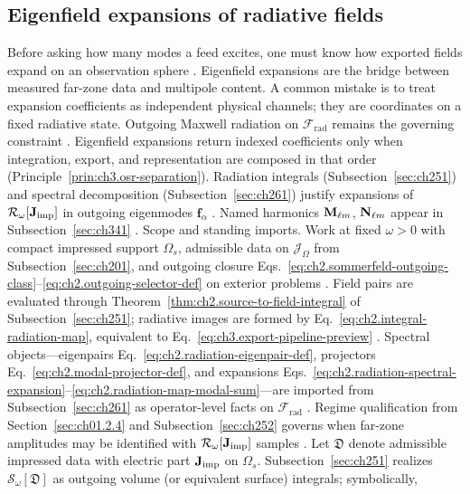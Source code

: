 \subsection{Eigenfield expansions of radiative fields}
\label{sec:ch302}
Before asking how many modes a feed excites, one must know how exported fields expand on an observation sphere \cite{stratton1941}. Eigenfield expansions are the bridge between measured far-zone data and multipole content. A common mistake is to treat expansion coefficients as independent physical channels; they are coordinates on a fixed radiative state. Outgoing Maxwell radiation on $\mathcal{F}_{\mathrm{rad}}$ remains the governing constraint \cite{stratton1941}.
Eigenfield expansions return indexed coefficients only when integration, export, and representation
are composed in that order (Principle~\ref{prin:ch3.osr-separation}). Radiation integrals
(Subsection~\ref{sec:ch251}) and spectral decomposition (Subsection~\ref{sec:ch261}) justify
expansions of \(\mathcal{R}_\omega[\mathbf{J}_{\mathrm{imp}}]\) in outgoing eigenmodes \(\mathbf{f}_\alpha\)
\cite{stratton1941}. Named harmonics \(\mathbf{M}_{\ell m}\), \(\mathbf{N}_{\ell m}\) appear in
Subsection~\ref{sec:ch341} \cite{hansen1988}.
Scope and standing imports. Work at fixed \(\omega>0\) with compact impressed support \(\Omega_s\), admissible data on
\(\mathcal{J}_\Omega\) from Subsection~\ref{sec:ch201}, and outgoing closure
Eqs.~\eqref{eq:ch2.sommerfeld-outgoing-class}--\eqref{eq:ch2.outgoing-selector-def} on exterior
problems \cite{stratton1941}. Field pairs are evaluated through Theorem~\ref{thm:ch2.source-to-field-integral}
of Subsection~\ref{sec:ch251}; radiative images are formed by
Eq.~\eqref{eq:ch2.integral-radiation-map}, equivalent to Eq.~\eqref{eq:ch3.export-pipeline-preview}
\cite{harrington2001}. Spectral objects---eigenpairs Eq.~\eqref{eq:ch2.radiation-eigenpair-def},
projectors Eq.~\eqref{eq:ch2.modal-projector-def}, and expansions
Eqs.~\eqref{eq:ch2.radiation-spectral-expansion}--\eqref{eq:ch2.radiation-map-modal-sum}---are
imported from Subsection~\ref{sec:ch261} as operator-level facts on \(\mathcal{F}_{\mathrm{rad}}\)
\cite{stratton1941}. Regime qualification from Section~\ref{sec:ch01.2.4} and
Subsection~\ref{sec:ch252} governs when far-zone amplitudes may be identified with
\(\mathcal{R}_\omega[\mathbf{J}_{\mathrm{imp}}]\) samples \cite{stratton1941}.
Let \(\mathfrak{D}\) denote admissible impressed data with electric part \({\mathbf{J}_{\mathrm{imp}}}\) on
\(\Omega_s\). Subsection~\ref{sec:ch251} realizes \(\mathcal{S}_\omega[\mathfrak{D}]\) as outgoing
volume (or equivalent surface) integrals; symbolically,
